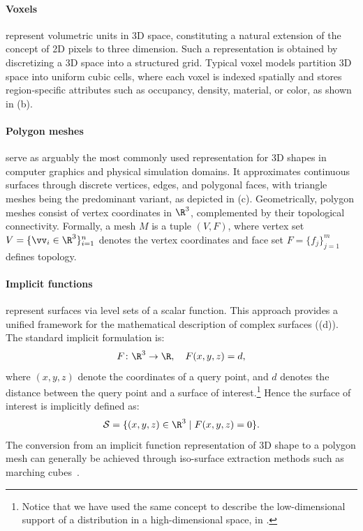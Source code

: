 \documentclass[../../book-main.tex]{subfiles}
\begin{document}
\paragraph{Voxels}
represent volumetric units in 3D space, constituting a natural
extension of the concept of 2D pixels to three dimension.
Such a
representation is obtained by discretizing a 3D space into a structured grid.
Typical voxel models partition 3D space into uniform cubic cells,
where each voxel is indexed spatially and stores region-specific
attributes such as occupancy, density, material, or color, as shown
in (b).

\paragraph{Polygon meshes}
serve as arguably the most commonly used representation for 3D shapes
in computer graphics and physical simulation domains.
It approximates
continuous surfaces through discrete vertices, edges, and polygonal
faces, with triangle meshes being the predominant variant, as
depicted in (c).
Geometrically, polygon meshes consist of vertex coordinates in \(\R^3\),
complemented by their topological connectivity.
Formally, a mesh \(M\) is a tuple
\((V, F)\), where vertex set \(V=\{\vv_i\in\R^3\}_{i=1}^n\)
denotes the vertex coordinates and face set \(F=\{f_j\}_{j=1}^m\)
defines topology.

\paragraph{Implicit functions}
represent surfaces via level sets of a scalar function.
This approach
provides a unified framework for the mathematical description of
complex surfaces ((d)).
The standard implicit formulation is:
\begin{equation}
\label{eq:implicit_function}
F \colon \R^3 \to \R, \quad F(x, y, z) = d ,
\end{equation}
where \((x, y, z)\) denote the coordinates of a query point, and \(d\)
denotes the distance between the query point and a surface of
interest.\footnote{Notice that we have used the same concept to
describe the low-dimensional support of a distribution in a
high-dimensional space, in .} Hence the
surface of interest is implicitly defined as:
\begin{equation}
\label{eq:implicit_function_surface}
\mathcal{S} = \{ (x, y, z) \in \R^3 \mid F(x, y, z)=0 \} .
\end{equation}
The conversion from an implicit function representation of 3D shape
to a polygon mesh can generally be achieved through iso-surface
extraction methods such as marching cubes~\citep{10.1145/280811.281026}.
\end{document}
